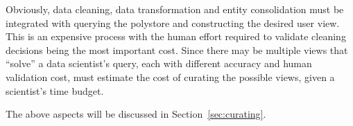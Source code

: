 

Obviously, data cleaning, data transformation and entity consolidation must be integrated with querying the polystore and constructing the desired user view.  
This is an expensive process with the human effort required to validate cleaning decisions being the most important cost. 
Since there may be multiple views that ``solve'' a data scientist's query, each with different accuracy and human validation cost, \dcv must estimate the cost of curating the possible views,
given a scientist's time budget. 





The above aspects will be discussed in Section~\ref{sec:curating}.



